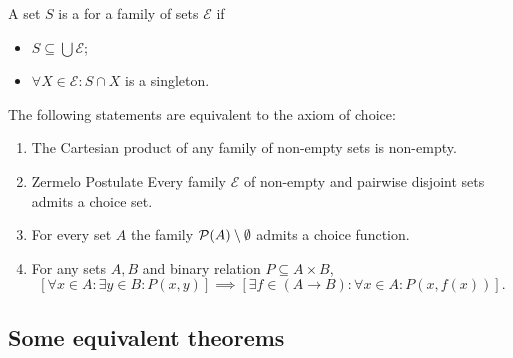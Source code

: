 \begin{definition}
A set $S$ is a  for a family of sets $\mathcal{E}$ if
\begin{itemize}
\item $S\subseteq \bigcup \mathcal{E}$;
\item $\forall X \in \mathcal{E}: S\cap X$ is a singleton.
\end{itemize}
\end{definition}

\begin{proposition} \label{proposition:choiceEquivalents}
The following statements are equivalent to the axiom of choice:
\begin{enumerate}
\item The Cartesian product of any family of non-empty sets is non-empty.
\item \textup{Zermelo Postulate} Every family $\mathcal{E}$ of non-empty and pairwise disjoint sets admits a choice set.
\item For every set $A$ the family $\operatorname{\mathcal{P}}(A)\setminus \emptyset$ admits a choice function.
\item For any sets $A,B$ and binary relation $P\subseteq A\times B$,
\[ \left[\forall x\in A: \exists y \in B: P(x,y)\right] \implies \left[ \exists f\in(A\to B): \forall x\in A: P(x,f(x)) \right].  \]
\end{enumerate}
\end{proposition}

\subsection{Some equivalent theorems}

